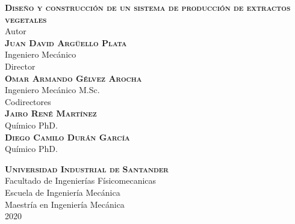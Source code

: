 \begin{titlepage}
	\centering
	\textbf{\textsc{{\Huge Diseño y construcción de un 				sistema de producción de 								extractos 			vegetales}}}\\
	\vspace{2 cm}
	Autor\\
	\textbf{\textsc{{\Large Juan David Argüello Plata}}}\\
	Ingeniero Mecánico\\
	\vspace{2 cm}
	Director\\
	\textbf{\textsc{\Large Omar Armando Gélvez Arocha}}\\
	Ingeniero Mecánico M.Sc.\\
	\vspace{2 cm}
	Codirectores\\
	\vspace{0.25 cm}
	\textbf{\textsc{\Large Jairo René Martínez}}\\
	Químico PhD.\\
	\vspace{0.25 cm}
	\textbf{\textsc{\Large Diego Camilo Durán García}}\\
	Químico PhD.\\
	
	\vspace{2 cm}
	
	\textbf{\textsc{\Large Universidad Industrial de Santander}}\\
	\large Facultado de Ingenierías Físicomecanicas\\ Escuela de Ingeniería Mecánica\\ Maestría en Ingeniería Mecánica\\ 
	2020

\end{titlepage}